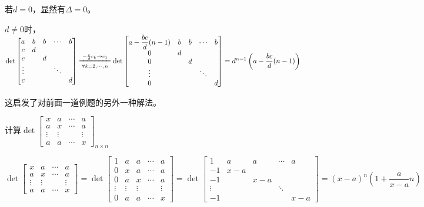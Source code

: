                 \begin{solution}
                    若$d=0$，显然有$\Delta=0$。

                    $d\neq0$时，$\det\begin{bmatrix}a&b&b&\cdots&b\\c&d&&&\\c&&d&&\\\vdots&&&\ddots&\\c&&&&d\end{bmatrix}\xlongequal[\forall k=2,\cdots,n]{-\frac{c}{d}c_k\rightarrow c_1}\det\begin{bmatrix}a-\dfrac{bc}{d}(n-1)&b&b&\cdots&b\\0&d&&&\\0&&d&&\\\vdots&&&\ddots&\\0&&&&d\end{bmatrix}=d^{n-1}\left(a-\dfrac{bc}{d}(n-1)\right)$
                \end{solution}

                这启发了对前面一道例题的另外一种解法。

                \begin{example}
                    计算$\det\begin{bmatrix}x&a&\cdots&a\\a&x&\cdots&a\\\vdots&\vdots&&\vdots\\a&a&\cdots&x\end{bmatrix}_{n\times n}$
                \end{example}

                \begin{solution}
                    $\det\begin{bmatrix}x&a&\cdots&a\\a&x&\cdots&a\\\vdots&\vdots&&\vdots\\a&a&\cdots&x\end{bmatrix}=\det\begin{bmatrix}1&a&a&\cdots&a\\0&x&a&\cdots&a\\0&a&x&\cdots&a\\\vdots&\vdots&\vdots&&\vdots\\0&a&a&\cdots&x\end{bmatrix}=\det\begin{bmatrix}1&a&a&\cdots&a\\-1&x-a&&&\\-1&&x-a&&\\\vdots&&&\ddots&\\-1&&&&x-a\end{bmatrix}=(x-a)^{n}\left(1+\dfrac{a}{x-a}n\right)$
                \end{solution}


